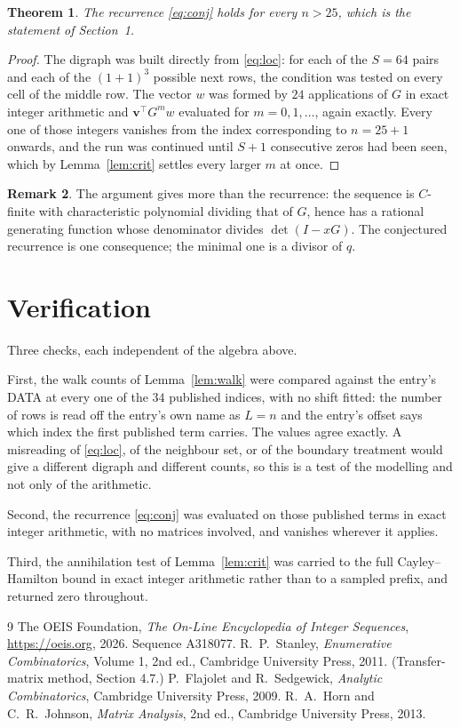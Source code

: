 \documentclass[11pt,a4paper]{article}
\theoremstyle{plain}
\newtheorem{theorem}{Theorem}
\theoremstyle{definition}
\newtheorem{remark}[theorem]{Remark}
\begin{document}
\begin{theorem}
The recurrence \eqref{eq:conj} holds for every $n>25$, which is the statement of
Section~1.
\end{theorem}

\begin{proof}
The digraph was built directly from \eqref{eq:loc}: for each of the $S=64$ pairs and each
of the $(1+1)^{3}$ possible next rows, the condition was tested on every cell of
the middle row. The vector $w$ was formed by $24$ applications of $G$ in exact integer
arithmetic and $\mathbf{v}^{\!\top}G^{m}w$ evaluated for $m=0,1,\dots$, again exactly.
Every one of those integers vanishes from the index corresponding to $n=25+1$ onwards,
and the run was continued until $S+1$ consecutive zeros had been seen, which by
Lemma~\ref{lem:crit} settles every larger $m$ at once.
\end{proof}

\begin{remark}
The argument gives more than the recurrence: the sequence is $C$-finite with characteristic
polynomial dividing that of $G$, hence has a rational generating function whose denominator
divides $\det(I-xG)$. The conjectured recurrence is one consequence; the minimal one is a
divisor of $q$.
\end{remark}

\section{Verification}

Three checks, each independent of the algebra above.

First, the walk counts of Lemma~\ref{lem:walk} were compared against the entry's DATA at
every one of the $34$ published indices, with no shift fitted: the number of rows is
read off the entry's own name as $L=n$ and the entry's offset says which index the first
published term carries. The values agree exactly. A misreading of \eqref{eq:loc}, of the
neighbour set, or of the boundary treatment would give a different digraph and different
counts, so this is a test of the modelling and not only of the arithmetic.

Second, the recurrence \eqref{eq:conj} was evaluated on those published terms in exact
integer arithmetic, with no matrices involved, and vanishes wherever it applies.

Third, the annihilation test of Lemma~\ref{lem:crit} was carried to the full
Cayley--Hamilton bound in exact integer arithmetic rather than to a sampled prefix, and
returned zero throughout.

\begin{thebibliography}{9}
 The OEIS Foundation, \emph{The On-Line Encyclopedia of Integer
Sequences}, \url{https://oeis.org}, 2026. Sequence A318077.
 R.~P.~Stanley, \emph{Enumerative Combinatorics}, Volume 1, 2nd ed.,
Cambridge University Press, 2011. (Transfer-matrix method, Section 4.7.)
 P.~Flajolet and R.~Sedgewick, \emph{Analytic Combinatorics}, Cambridge
University Press, 2009.
 R.~A.~Horn and C.~R.~Johnson, \emph{Matrix Analysis}, 2nd ed., Cambridge
University Press, 2013.
\end{thebibliography}
\end{document}
